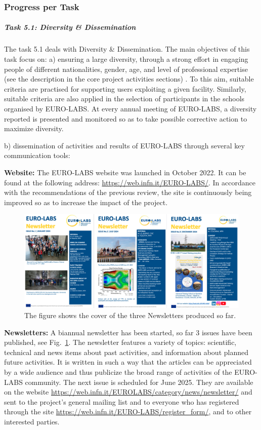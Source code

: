 \subsubsection*{Progress per Task}
\subparagraph{Task 5.1: Diversity \& Dissemination\\}

The task 5.1 deals with Diversity \& Dissemination.
The main objectives of this task focus on:
a) ensuring a large diversity, through a strong effort in engaging people of different nationalities, gender, age, and level of professional expertise (see the description in the core project activities sections) . To this aim, suitable criteria are practised for supporting users exploiting a given facility. Similarly, suitable criteria are also applied in the selection of participants in the schools organised by EURO-LABS. At every annual meeting of EURO-LABS, a diversity reported is presented and monitored so as to take possible corrective action to maximize diversity.

b) dissemination of activities and results of EURO-LABS through several key communication tools:

\textbf{Website:}
The EURO-LABS website was launched in October 2022. It can be found at the following address: \url{https://web.infn.it/EURO-LABS/}. In accordance with the recommendations of the previous review, the site is continuously being improved so as to increase the impact of the project.

\begin{figure}[!h]
    \centering
    \includegraphics[width=1.0\linewidth]{graphics/Newletter_figure.png}
    \caption{The figure shows the cover of the three Newsletters produced so far.
}
    \label{fig:Newletter_figure}
\end{figure}

\textbf{Newsletters:} 
A biannual newsletter has been started, so far 3 issues have been published, see Fig.~\ref{fig:Newletter_figure}. The newsletter features a variety of topics: scientific, technical and news items about past activities, and information about planned future activities. It is written in such a way that the articles can be appreciated by a wide audience and thus publicize the broad range of activities of the EURO-LABS community. The next issue  is scheduled for June 2025. 
They are available on the website \url{https://web.infn.it/EUROLABS/category/news/newsletter/} and sent to the project's general mailing list and to everyone who has registered through the site
\url{https://web.infn.it/EURO-LABS/register_form/}, and to other interested parties.

